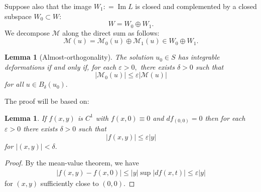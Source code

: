 \documentclass[12pt]{amsart}
\renewcommand{\Im}{\operatorname{Im}}
\newcommand{\calM}{\mathcal{M}}
\renewcommand{\1}{{\mathbf 1}}
\newcommand{\eps}{{\varepsilon}}
\newtheorem{lemma}[thm]{Lemma}
\theoremstyle{others}
\numberwithin{equation}{section}
\begin{document}
\noindent Suppose also that the image $W_1 : = \Im L$ is closed and complemented by a closed subspace $W_0 \subset W:$ %
$$W = W_0 \oplus W_1.$$
We decompose $\calM$ along the direct sum as follows:
\begin{equation}\label{Msplitting}
\calM(u) = \calM_0(u) \oplus \calM_1(u) \in W_0 \oplus W_1.
\end{equation}



\begin{lemma}[Almost-orthogonality]\label{lemma:almostorthog} The solution $u_0 \in S$ has integrable deformations if and only if, for each $\eps > 0,$ there exists $\delta > 0$ such that
\begin{equation}\label{almostorthog:est}
    | \calM_0(u) | \leq \eps | \calM(u) |
\end{equation}
for all $u \in B_{\delta}(u_0).$
\end{lemma}

The proof will be based on:
\begin{lemma}\label{lemma:fvanident}
    If $f(x,y)$ is $C^1$ with $f(x,0) \equiv 0$ and $df_{(0,0)} = 0$ then for each $\eps > 0$ there exists $\delta > 0$ such that
    \begin{equation}
        |f(x,y)| \leq \eps |y|
    \end{equation}
    for $|(x,y)| < \delta.$
\end{lemma}
\begin{proof}
    By the mean-value theorem, we have
    \begin{equation*}
    \begin{split}
    |f(x,y) - f(x,0)|\leq |y| \sup |df(x,t)| \leq \eps |y|
    \end{split}
    \end{equation*}
    for $(x,y)$ sufficiently close to $(0,0).$
\end{proof}
\end{document}
